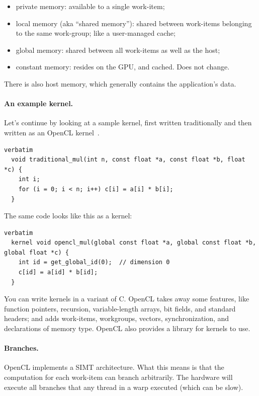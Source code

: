 \begin{itemize}
\item private memory: available to a single work-item;
\item local memory (aka ``shared memory''): shared between work-items
  belonging to the same work-group; like a user-managed cache;
\item global memory: shared between all work-items as well as the host;
\item constant memory: resides on the GPU, and cached. Does not change.
\end{itemize}

There is also host memory, which generally contains the application's
data.

\paragraph{An example kernel.} Let's continue by looking at 
a sample kernel, first written traditionally and then written
as an OpenCL kernel~\cite{khronos}.

{\scriptsize \hspace*{2em} \begin{minipage}{.8\textwidth} \begin{lstlisting}verbatim
  void traditional_mul(int n, const float *a, const float *b, float *c) {
    int i;
    for (i = 0; i < n; i++) c[i] = a[i] * b[i];
  }
    \end{lstlisting}
  \end{minipage}
  }

The same code looks like this as a kernel:

{\scriptsize \hspace*{1em} \begin{minipage}{.8\textwidth} \begin{lstlisting}verbatim
  kernel void opencl_mul(global const float *a, global const float *b, global float *c) {
    int id = get_global_id(0);  // dimension 0
    c[id] = a[id] * b[id];
  }
    \end{lstlisting}
  \end{minipage}
}

You can write kernels in a variant of C. OpenCL takes away some features,
like function pointers, recursion, variable-length arrays, bit fields,
and standard headers; and adds work-items, workgroups, vectors,
synchronization, and declarations of memory type. OpenCL also provides
a library for kernels to use.

\paragraph{Branches.} OpenCL implements a SIMT architecture.
What this means is that the computation for each work-item can branch
arbitrarily. The hardware will execute all branches that any thread in
a warp executed (which can be slow). 

